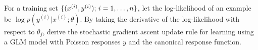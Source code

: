 \item {} For a training set
$\{(x^{(i)}, y^{(i)});\, i=1,\ldots,{n}\}$, let the log-likelihood of an example
be $\log p(y^{(i)} | x^{(i)}; \theta)$. By taking the derivative of the
log-likelihood with respect to $\theta_j$, derive the stochastic gradient
ascent update rule for learning using a GLM model with Poisson responses $y$
and the canonical response function.
